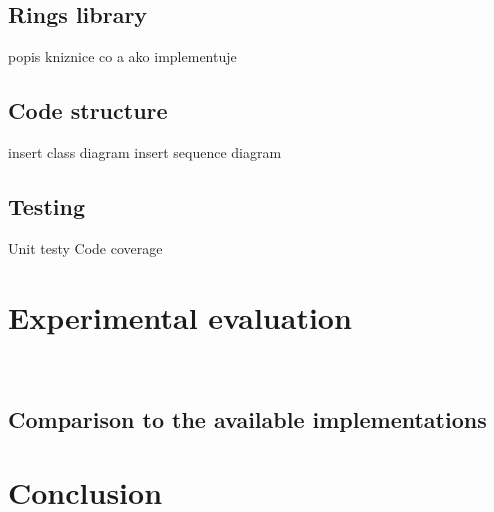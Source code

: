 \documentclass[
  digital, %
  twoside, %
  table,   %
  nolof,     %
  nolot,     %
]{fithesis3}
\begin{document}
\section{Rings library}
popis kniznice
co a ako implementuje
\section{Code structure}
insert class diagram
insert sequence diagram
\section{Testing}
Unit testy
Code coverage

\chapter{Experimental evaluation}
\
\section{Comparison to the available implementations}
\chapter{Conclusion}

  \printbibliography[heading=bibintoc] %
\end{document}
